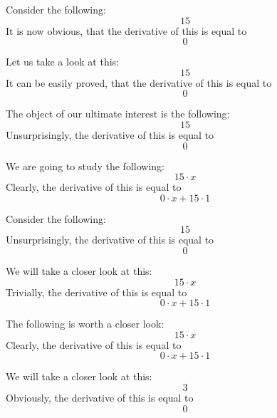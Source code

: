 \documentclass{article}
\begin{document}
Consider the following:
\begin{equation}
15 
\end{equation}
It is now obvious, that the derivative of this is equal to
\begin{equation}
0 
\end{equation}

Let us take a look at this:
\begin{equation}
15 
\end{equation}
It can be easily proved, that the derivative of this is equal to
\begin{equation}
0 
\end{equation}

The object of our ultimate interest is the following:
\begin{equation}
15 
\end{equation}
Unsurprisingly, the derivative of this is equal to
\begin{equation}
0 
\end{equation}

We are going to study the following:
\begin{equation}
15 \cdot x 
\end{equation}
Clearly, the derivative of this is equal to
\begin{equation}
0 \cdot x + 15 \cdot 1 
\end{equation}

Consider the following:
\begin{equation}
15 
\end{equation}
Unsurprisingly, the derivative of this is equal to
\begin{equation}
0 
\end{equation}

We will take a closer look at this:
\begin{equation}
15 \cdot x 
\end{equation}
Trivially, the derivative of this is equal to
\begin{equation}
0 \cdot x + 15 \cdot 1 
\end{equation}

The following is worth a closer look:
\begin{equation}
15 \cdot x 
\end{equation}
Clearly, the derivative of this is equal to
\begin{equation}
0 \cdot x + 15 \cdot 1 
\end{equation}

We will take a closer look at this:
\begin{equation}
3 
\end{equation}
Obviously, the derivative of this is equal to
\begin{equation}
0 
\end{equation}
\end{document}
